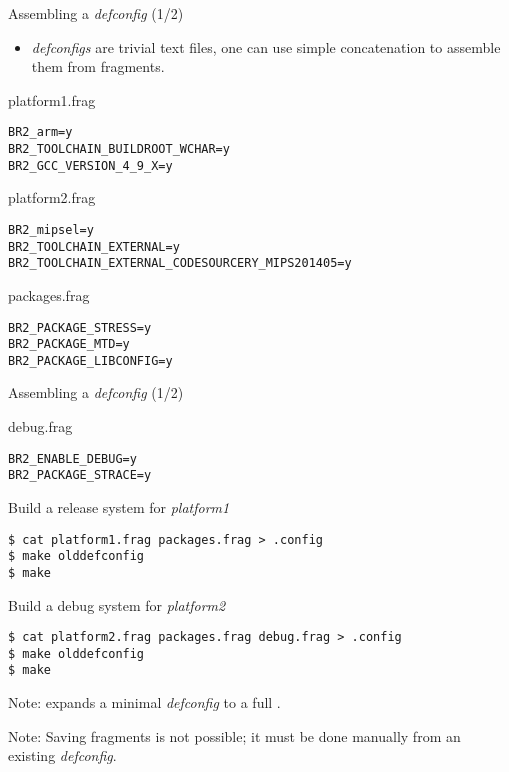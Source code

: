 \begin{frame}[fragile]{Assembling a {\em defconfig} (1/2)}

  \begin{itemize}
  \item {\em defconfigs} are trivial text files, one can use simple
    concatenation to assemble them from fragments.
  \end{itemize}

{\small
   \begin{block}{platform1.frag}
\begin{verbatim}
BR2_arm=y
BR2_TOOLCHAIN_BUILDROOT_WCHAR=y
BR2_GCC_VERSION_4_9_X=y
\end{verbatim}
   \end{block}
}

{\small
    \begin{block}{platform2.frag}
\begin{verbatim}
BR2_mipsel=y
BR2_TOOLCHAIN_EXTERNAL=y
BR2_TOOLCHAIN_EXTERNAL_CODESOURCERY_MIPS201405=y
\end{verbatim}
    \end{block}
}

{\small
   \begin{block}{packages.frag}
\begin{verbatim}
BR2_PACKAGE_STRESS=y
BR2_PACKAGE_MTD=y
BR2_PACKAGE_LIBCONFIG=y
\end{verbatim}
   \end{block}
}

\end{frame}

\begin{frame}[fragile]{Assembling a {\em defconfig} (1/2)}

  \begin{block}{debug.frag}
    {\small
\begin{verbatim}
BR2_ENABLE_DEBUG=y
BR2_PACKAGE_STRACE=y
\end{verbatim}
    }
  \end{block}

  \begin{block}{Build a release system for {\em platform1}}
    {\small
\begin{verbatim}
$ cat platform1.frag packages.frag > .config
$ make olddefconfig
$ make
\end{verbatim}
    }
  \end{block}

  \begin{block}{Build a debug system for {\em platform2}}
    {\small
\begin{verbatim}
$ cat platform2.frag packages.frag debug.frag > .config
$ make olddefconfig
$ make
\end{verbatim}
    }
  \end{block}

  Note:  expands a minimal {\em defconfig} to a full
  .

  Note: Saving fragments is not possible; it must be done manually from
  an existing {\em defconfig}.

\end{frame}

